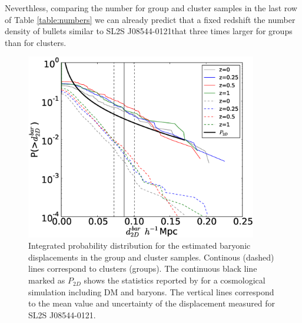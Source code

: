 \documentclass{emulateapj}
\newcommand{\bullg}{SL2S J08544-0121}
\begin{document}
Neverthless, comparing the number for group and cluster samples in the
last row of Table \ref{table:numbers} we can already predict that a
fixed redshift the number density of bullets similar to \bullg that
three times larger for groups than for clusters.   




\begin{figure}
\begin{center}
\includegraphics[width=0.9\textwidth]{figure_3.eps}
\end{center}
\caption{Integrated probability distribution for the estimated
  baryonic displacements in the group and cluster samples. Continous (dashed)
  lines correspond to clusters (groups). The continuous black line
  marked as $P_{2D}$ shows the statistics reported by
  \citet{ForeroRomero2010} for a cosmological simulation including DM
  and baryons. The vertical lines correspond to the mean value and
  uncertainty of the displacement measured for \bullg.} 
\label{fig:baryonic_displacements}
\end{figure}
\end{document}

